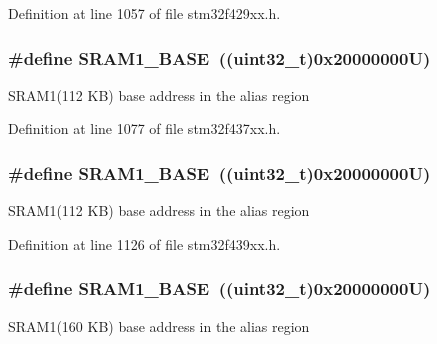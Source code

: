 Definition at line 1057 of file stm32f429xx.\+h.

\subsubsection[{\texorpdfstring{S\+R\+A\+M1\+\_\+\+B\+A\+SE}{SRAM1_BASE}}]{\setlength{\rightskip}{0pt plus 5cm}\#define S\+R\+A\+M1\+\_\+\+B\+A\+SE~((uint32\+\_\+t)0x20000000\+U)}\hypertarget{group___peripheral__memory__map_ga7d0fbfb8894012dbbb96754b95e562cd}{}\label{group___peripheral__memory__map_ga7d0fbfb8894012dbbb96754b95e562cd}
S\+R\+A\+M1(112 K\+B) base address in the alias region 

Definition at line 1077 of file stm32f437xx.\+h.

\subsubsection[{\texorpdfstring{S\+R\+A\+M1\+\_\+\+B\+A\+SE}{SRAM1_BASE}}]{\setlength{\rightskip}{0pt plus 5cm}\#define S\+R\+A\+M1\+\_\+\+B\+A\+SE~((uint32\+\_\+t)0x20000000\+U)}\hypertarget{group___peripheral__memory__map_ga7d0fbfb8894012dbbb96754b95e562cd}{}\label{group___peripheral__memory__map_ga7d0fbfb8894012dbbb96754b95e562cd}
S\+R\+A\+M1(112 K\+B) base address in the alias region 

Definition at line 1126 of file stm32f439xx.\+h.

\subsubsection[{\texorpdfstring{S\+R\+A\+M1\+\_\+\+B\+A\+SE}{SRAM1_BASE}}]{\setlength{\rightskip}{0pt plus 5cm}\#define S\+R\+A\+M1\+\_\+\+B\+A\+SE~((uint32\+\_\+t)0x20000000\+U)}\hypertarget{group___peripheral__memory__map_ga7d0fbfb8894012dbbb96754b95e562cd}{}\label{group___peripheral__memory__map_ga7d0fbfb8894012dbbb96754b95e562cd}
S\+R\+A\+M1(160 K\+B) base address in the alias region 

